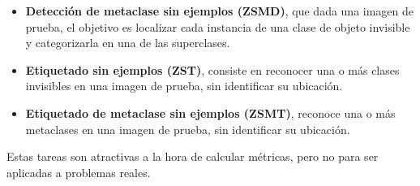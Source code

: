 \begin{itemize}

	\item \textbf{Detección de metaclase sin ejemplos (ZSMD)}, que dada una imagen de prueba, el objetivo es localizar cada instancia de una clase de objeto invisible y categorizarla en una de las superclases.

	\item \textbf{Etiquetado sin ejemplos (ZST)}, consiste en reconocer una o más clases invisibles en una imagen de prueba, sin identificar su ubicación.

	\item \textbf{Etiquetado de metaclase sin ejemplos (ZSMT)}, reconoce una o más metaclases en una imagen de prueba, sin identificar su ubicación.

\end{itemize}

	Estas tareas son atractivas a la hora de calcular métricas, pero no para ser aplicadas a problemas reales.
